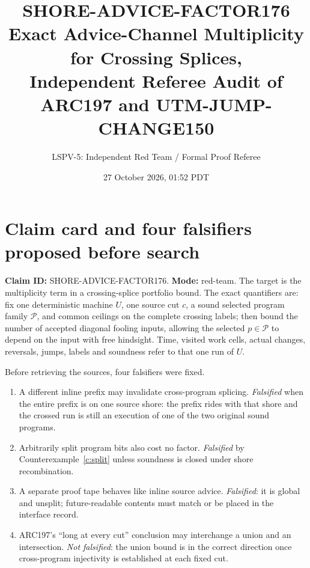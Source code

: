 \documentclass[11pt]{article}
\title{SHORE-ADVICE-FACTOR176\\
\large Exact Advice-Channel Multiplicity for Crossing Splices,\\
Independent Referee Audit of ARC197 and UTM-JUMP-CHANGE150}
\author{LSPV-5: Independent Red Team / Formal Proof Referee}
\date{27 October 2026, 01:52 PDT}
\begin{document}
\maketitle

\begin{center}
\end{center}

\section{Claim card and four falsifiers proposed before search}
\textbf{Claim ID:} SHORE-ADVICE-FACTOR176.  \textbf{Mode:} red-team.
The target is the multiplicity term in a crossing-splice portfolio bound.
The exact quantifiers are: fix one deterministic machine $U$, one source
cut $c$, a sound selected program family $\mathcal P$, and common ceilings
on the complete crossing labels; then bound the number of accepted diagonal
fooling inputs, allowing the selected $p\in\mathcal P$ to depend on the
input with free hindsight.  Time, visited work cells, actual changes,
reversals, jumps, labels and soundness refer to that one run of $U$.

Before retrieving the sources, four falsifiers were fixed.
\begin{enumerate}
\item A different inline prefix may invalidate cross-program splicing.
\emph{Falsified} when the entire prefix is on one source shore: the prefix
rides with that shore and the crossed run is still an execution of one of
the two original sound programs.
\item Arbitrarily split program bits also cost no factor.
\emph{Falsified} by Counterexample~\ref{c:split} unless soundness is closed
under shore recombination.
\item A separate proof tape behaves like inline source advice.
\emph{Falsified}: it is global and unsplit; future-readable contents must
match or be placed in the interface record.
\item ARC197's ``long at every cut'' conclusion may interchange a union and
an intersection.  \emph{Not falsified}: the union bound is in the correct
direction once cross-program injectivity is established at each fixed cut.
\end{enumerate}
\end{document}
